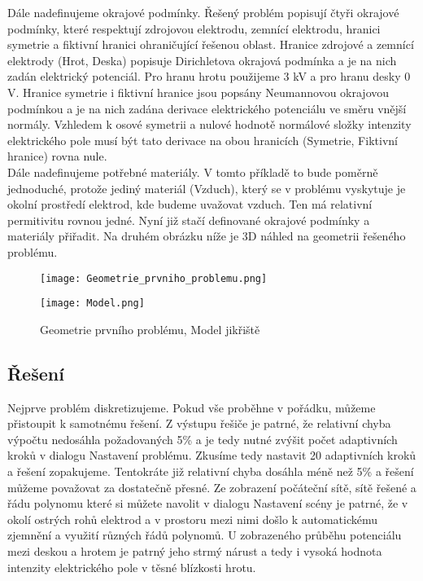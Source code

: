 \documentclass[a4paper, oneside]{article}
\begin{document}
	Dále nadefinujeme okrajové podmínky. Řešený problém popisují čtyři okrajové podmínky, které respektují zdrojovou elektrodu, zemnící elektrodu, hranici symetrie a fiktivní hranici ohraničující řešenou oblast. Hranice zdrojové a zemnící elektrody (Hrot, Deska) popisuje Dirichletova okrajová podmínka a je na nich zadán elektrický potenciál. Pro hranu hrotu použijeme 3 kV a pro hranu desky 0 V. Hranice symetrie i fiktivní hranice jsou popsány Neumannovou okrajovou podmínkou a je na nich zadána derivace elektrického potenciálu ve směru vnější normály. Vzhledem k osové symetrii a nulové hodnotě normálové složky intenzity elektrického pole musí být tato derivace na obou hranicích (Symetrie, Fiktivní hranice) rovna nule.\\
Dále nadefinujeme potřebné materiály. V tomto příkladě to bude poměrně jednoduché, protože jediný materiál (Vzduch), který se v problému vyskytuje je okolní prostředí elektrod, kde budeme uvažovat vzduch. Ten má relativní permitivitu rovnou jedné. Nyní již stačí definované okrajové podmínky a materiály přiřadit. Na druhém obrázku níže je 3D náhled na geometrii řešeného problému.\\

\begin{figure}[htbp]
	\centering
	\begin{minipage}{7cm}
		\centering
		\texttt{[image: Geometrie\_prvniho\_problemu.png]}
	\end{minipage}
	\begin{minipage}{5cm}
		\centering
		\texttt{[image: Model.png]}
	\end{minipage}
	\caption{Geometrie prvního problému, Model jikřiště}
\end{figure}

\subsection{Řešení}
Nejprve problém diskretizujeme. Pokud vše proběhne v pořádku, můžeme přistoupit k samotnému řešení. Z výstupu řešiče je patrné, že relativní chyba výpočtu nedosáhla požadovaných 5\% a je tedy nutné zvýšit počet adaptivních kroků v dialogu Nastavení problému. Zkusíme tedy nastavit 20 adaptivních kroků a řešení zopakujeme. Tentokráte již relativní chyba dosáhla méně než 5\% a řešení můžeme považovat za dostatečně přesné. Ze zobrazení počáteční sítě, sítě řešené a řádu polynomu které si můžete navolit v dialogu Nastavení scény je patrné, že v okolí ostrých rohů elektrod a v prostoru mezi nimi došlo k automatickému zjemnění a využití různých řádů polynomů. U zobrazeného průběhu potenciálu mezi deskou a hrotem je patrný jeho strmý nárust a tedy i vysoká hodnota intenzity elektrického pole v těsné blízkosti hrotu.\\
\end{document}
